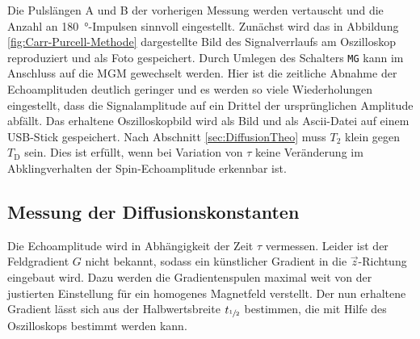 Die Pulslängen A und B der vorherigen Messung werden vertauscht und die Anzahl an
\SI{180}{\degree}-Impulsen sinnvoll eingestellt.
Zunächst wird das in Abbildung \ref{fig:Carr-Purcell-Methode} dargestellte
Bild des Signalverrlaufs am Oszilloskop reproduziert und als Foto gespeichert.
Durch Umlegen des Schalters \texttt{MG} kann im Anschluss auf die MGM gewechselt werden.
Hier ist die zeitliche Abnahme der Echoamplituden deutlich geringer und es
werden so viele Wiederholungen eingestellt, dass die Signalamplitude auf ein Drittel
der ursprünglichen Amplitude abfällt.
Das erhaltene Oszilloskopbild wird als Bild und als Ascii-Datei auf einem USB-Stick
gespeichert.
Nach Abschnitt \ref{sec:DiffusionTheo} muss $T_2$ klein gegen $T_\text{D}$ sein.
Dies ist erfüllt, wenn bei Variation von $\tau$ keine Veränderung im Abklingverhalten
der Spin-Echoamplitude erkennbar ist.


\subsection{Messung der Diffusionskonstanten}
\label{sec:DurchDiffusion}

Die Echoamplitude wird in Abhängigkeit der Zeit $\tau$ vermessen.
Leider ist der Feldgradient $G$ nicht bekannt, sodass ein künstlicher Gradient
in die $\vec{z}$-Richtung eingebaut wird. Dazu werden die Gradientenspulen maximal
weit von der justierten Einstellung für ein homogenes Magnetfeld verstellt.
Der nun erhaltene Gradient lässt sich aus der Halbwertsbreite $t_{\sfrac{1}{2}}$
bestimmen, die mit Hilfe des Oszilloskops bestimmt werden kann.
